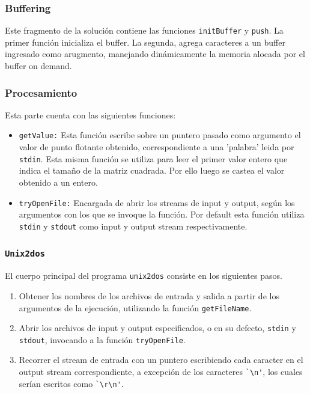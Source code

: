 \documentclass[a4paper,10pt, spanish]{article}
\begin{document}
\subsubsection{Buffering}

Este fragmento de la solución contiene las funciones \lstinline{initBuffer} y \lstinline{push}. La primer función inicializa el buffer. 
La segunda, agrega caracteres a un buffer ingresado como arugmento, manejando dinámicamente la memoria alocada por el buffer on demand.

\subsubsection{Procesamiento}

Esta parte cuenta con las siguientes funciones: 

\begin{itemize}
  \item \lstinline{getValue:} Esta función escribe sobre un puntero pasado como argumento el valor de punto flotante obtenido, correspondiente a una 'palabra' leida por \lstinline{stdin}. 
  Esta misma función se utiliza para leer el primer valor entero que indica el tamaño de la matriz cuadrada. Por ello luego se castea el valor obtenido a un entero.
	\item \lstinline{tryOpenFile:} Encargada de abrir los streams de input y output, según los
  argumentos con los que se invoque la función. Por default esta función utiliza \lstinline{stdin} 
  y \lstinline{stdout} como input y output stream respectivamente.
\end{itemize}


\subsubsection{\lstinline{Unix2dos}}

El cuerpo principal del programa \lstinline{unix2dos} consiste en los siguientes pasos.

\begin{enumerate}
	\item Obtener los nombres de los archivos de entrada y salida a partir de los argumentos de la
	ejecución, utilizando la función \lstinline{getFileName}.
	\item Abrir los archivos de input y output especificados, o en su defecto, \lstinline{stdin} y \lstinline{stdout},
	invocando a la función \lstinline{tryOpenFile}.
	\item Recorrer el stream de entrada con un puntero escribiendo cada caracter en el output stream
  correspondiente, a excepción de los caracteres \lstinline{`\n'}, los cuales serían escritos como
  \lstinline{`\r\n'}.
\end{enumerate}
\end{document}
